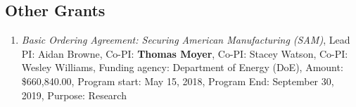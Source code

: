 
\setcounter{subsection}{5} %
\hypertarget{other-grants}{%
\subsection{Other Grants}\label{other-grants}}

\begin{enumerate}
\item \textit{Basic Ordering Agreement: Securing American Manufacturing (SAM)}, Lead PI: Aidan Browne, Co-PI: \textbf{Thomas Moyer}, Co-PI: Stacey Watson, Co-PI: Wesley Williams, Funding agency: Department of Energy (DoE), Amount: \$660,840.00, Program start: May 15, 2018, Program End: September 30, 2019, Purpose: Research
\end{enumerate}